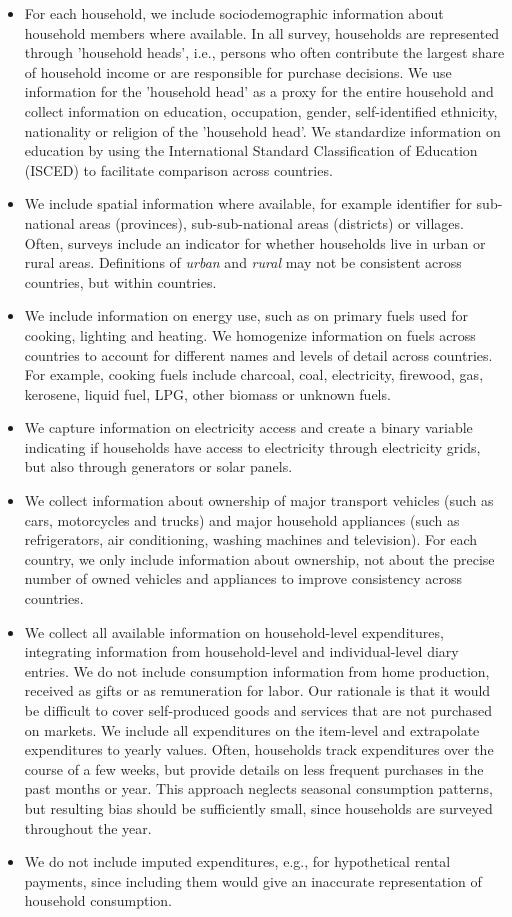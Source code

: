 \documentclass[12pt, a4paper]{article}
\begin{document}
\begin{itemize}
    \item For each household, we include sociodemographic information about household members where available. In all survey, households are represented through 'household heads', i.e., persons who often contribute the largest share of household income or are responsible for purchase decisions. We use information for the 'household head' as a proxy for the entire household and collect information on education, occupation, gender, self-identified ethnicity, nationality or religion of the 'household head'. We standardize information on education by using the International Standard Classification of Education (ISCED) to facilitate comparison across countries.
    \item We include spatial information where available, for example identifier for sub-national areas (provinces), sub-sub-national areas (districts) or villages. Often, surveys include an indicator for whether households live in urban or rural areas. Definitions of \textit{urban} and \textit{rural} may not be consistent across countries, but within countries.
    \item We include information on energy use, such as on primary fuels used for cooking, lighting and heating. We homogenize information on fuels across countries to account for different names and levels of detail across countries. For example, cooking fuels include charcoal, coal, electricity, firewood, gas, kerosene, liquid fuel, LPG, other biomass or unknown fuels.
    \item We capture information on electricity access and create a binary variable indicating if households have access to electricity through electricity grids, but also through generators or solar panels. 
    \item We collect information about ownership of major transport vehicles (such as cars, motorcycles and trucks) and major household appliances (such as refrigerators, air conditioning, washing machines and television). For each country, we only include information about ownership, not about the precise number of owned vehicles and appliances to improve consistency across countries.
    \item We collect all available information on household-level expenditures, integrating information from household-level and individual-level diary entries. We do not include consumption information from home production, received as gifts or as remuneration for labor. Our rationale is that it would be difficult to cover self-produced goods and services that are not purchased on markets. We include all expenditures on the item-level and extrapolate expenditures to yearly values. Often, households track expenditures over the course of a few weeks, but provide details on less frequent purchases in the past months or year. This approach neglects seasonal consumption patterns, but resulting bias should be sufficiently small, since households are surveyed throughout the year.
    \item We do not include imputed expenditures, e.g., for hypothetical rental payments, since including them would give an inaccurate representation of household consumption.
\end{itemize}
\end{document}
